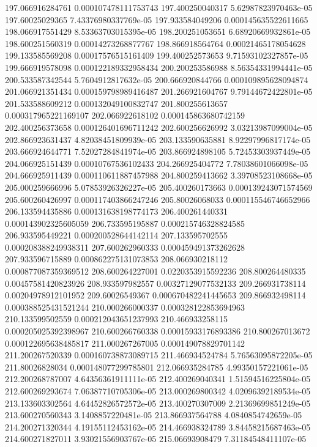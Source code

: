 {197.066916284761 0.000107478111753743
197.400250040317 5.62987823970463e-05
197.60025029365 7.43376980337769e-05
197.933584049206 0.000145635522611665
198.066917551429 8.53363703015395e-05
198.200251053651 6.68920669932861e-05
198.600251560319 0.00014273268877767
198.866918564764 0.00021465178054628
199.133585569208 0.00017576515161409
199.400252573653 9.71593102327857e-05
199.666919578098 0.000122189332958434
200.200253586988 8.56354331994441e-05
200.533587342544 5.7604912817632e-05
200.666920844766 0.000109895628094874
201.066921351434 0.000159798989416487
201.266921604767 9.79144672422801e-05
201.533588609212 0.000132049100832747
201.800255613657 0.000317965221169107
202.066922618102 0.000145863680742159
202.400256373658 0.000126401696711242
202.600256626992 3.03213987099004e-05
202.866923631437 4.82038451809939e-05
203.133590635881 8.92297996817174e-05
203.666924644771 7.52027284841974e-05
203.866924898105 5.72453303937449e-05
204.066925151439 0.00010767536102433
204.266925404772 7.78038601066098e-05
204.666925911439 0.000110611887457988
204.800259413662 3.39708523108668e-05
205.000259666996 5.07853926326227e-05
205.400260173663 0.000139243071574569
205.600260426997 0.000117403866247246
205.80026068033 0.000115546746652966
206.133594435886 0.000131638198774173
206.400261440331 0.000143902325605059
206.733595195887 0.000215746328824585
206.933595449221 0.000200528644142114
207.133595702555 0.000208388249938311
207.600262960333 0.000459491373262628
207.933596715889 0.000862275131073853
208.066930218112 0.000877087359369512
208.600264227001 0.0220353915592236
208.800264480335 0.00457581420823926
208.933597982557 0.00327129077532133
209.266931738114 0.00204978912101952
209.60026549367 0.000670482241445653
209.866932498114 0.000388525431521244
210.000266000337 0.000328122853694963
210.133599502559 0.000212043651237993
210.466933258115 0.000205025392398967
210.600266760338 0.00015933176893386
210.800267013672 0.000122695638485817
211.000267267005 0.000149078829701142
211.200267520339 0.000160738873089715
211.466934524784 5.76563095872205e-05
211.80026828034 0.000148077299785801
212.066935284785 4.99350157221061e-05
212.200268787007 4.64356361911111e-05
212.400269040341 1.51594516225804e-05
212.600269293674 7.06387710705306e-05
213.000269800342 4.02096392189534e-05
213.133603302564 4.64452826572572e-05
213.400270307009 2.21369699851249e-05
213.600270560343 3.1408857220481e-05
213.866937564788 4.0840854742659e-05
214.200271320344 4.19155112453162e-05
214.466938324789 3.84458215687463e-05
214.600271827011 3.93021556903767e-05
215.06693908479 7.31184548411107e-05
}
